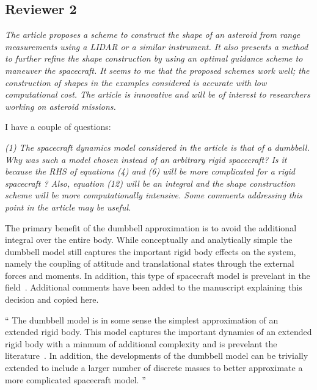 \documentclass[11pt]{article}
\newenvironment{correction}{\begin{list}{}{\setlength{\leftmargin}{1cm}\setlength{\rightmargin}{1cm}}\vspace{\parsep}\item[]``}{''\end{list}}
\newcommand{\comment}[1]{\item \itshape #1 \normalfont}
\begin{document}
\subsection*{Reviewer 2}
\begin{itemize}\setlength{\itemsep}{2\parsep}

    
    \comment{The article proposes a scheme to construct the shape of an asteroid from range measurements using a LIDAR or a similar instrument. 
        It also presents a method to further refine the shape construction by using an optimal guidance scheme to maneuver the spacecraft. 
        It seems to me that the proposed schemes work well; the construction of shapes in the examples considered is accurate with low computational cost. 
        The article is innovative and will be of interest to researchers working on asteroid missions.   

        I have a couple of questions:
    }


\comment{(1) The spacecraft dynamics model considered in the article is that of a dumbbell. 
Why was such a model chosen instead of an arbitrary rigid spacecraft?
Is it because the RHS of equations (4) and (6) will be more complicated for a rigid spacecraft ?
Also, equation (12) will be an integral and the shape construction scheme will be more computationally intensive.
Some comments addressing this point in the article may be useful.}

The primary benefit of the dumbbell approximation is to avoid the additional integral over the entire body.
While conceptually and analytically simple the dumbbell model still captures the important rigid body effects on the system, namely the coupling of attitude and translational states through the external forces and moments.
In addition, this type of spacecraft model is prevelant in the field~\cite{kulumani2017b,lee2006a,lee2007a,elmasri2005}.
Additional comments have been added to the manuscript explaining this decision and copied here.

\begin{correction}
The dumbbell model is in some sense the simplest approximation of an extended rigid body.
This model captures the important dynamics of an extended rigid body with a minmum of additional complexity and is prevelant the literature~\cite{kulumani2017b,lee2006a,lee2007a,elmasri2005}.
In addition, the developments of the dumbbell model can be trivially extended to include a larger number of discrete masses to better approximate a more complicated spacecraft model.
\end{correction}


\end{itemize}
\end{document}
